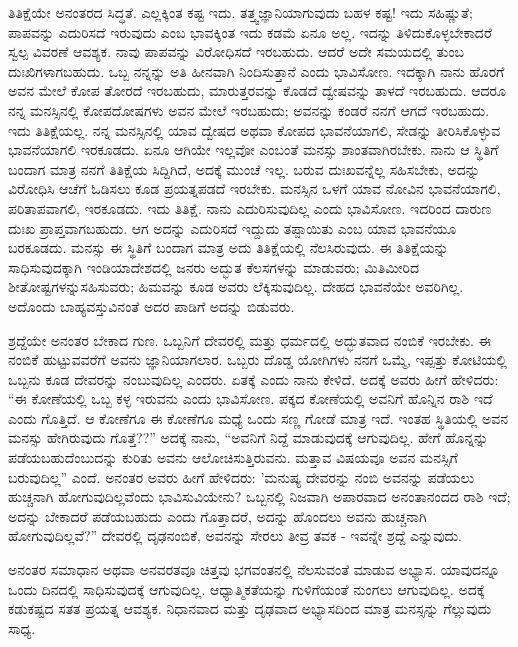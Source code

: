 ತಿತಿಕ್ಷೆಯೇ ಅನಂತರದ ಸಿದ್ಧತೆ. ಎಲ್ಲಕ್ಕಿಂತ ಕಷ್ಟ ಇದು. ತತ್ತ್ವಜ್ಞಾನಿಯಾಗುವುದು ಬಹಳ ಕಷ್ಟ! ಇದು ಸಹಿಷ್ಣುತೆ; ಪಾಪವನ್ನು ಎದುರಿಸದೆ ಇರುವುದು ಎಂಬ ಭಾವಕ್ಕಿಂತ ಇದು ಕಡಮೆ ಏನೂ ಅಲ್ಲ. ಇದನ್ನು ತಿಳಿದುಕೊಳ್ಳಬೇಕಾದರೆ ಸ್ವಲ್ಪ ವಿವರಣೆ ಆವಶ್ಯಕ. ನಾವು ಪಾಪವನ್ನು ವಿರೋಧಿಸದೆ ಇರಬಹುದು. ಆದರೆ ಅದೇ ಸಮಯದಲ್ಲಿ ತುಂಬ ದುಃಖಿಗಳಾಗಬಹುದು. ಒಬ್ಬ ನನ್ನನ್ನು ಅತಿ ಹೀನವಾಗಿ ನಿಂದಿಸುತ್ತಾನೆ ಎಂದು ಭಾವಿಸೋಣ. ಇದಕ್ಕಾಗಿ ನಾನು ಹೊರಗೆ ಅವನ ಮೇಲೆ ಕೋಪ ತೋರದೆ ಇರಬಹುದು, ಮಾರುತ್ತರವನ್ನು ಕೊಡದೆ ದ್ವೇಷವನ್ನು ತಾಳದೆ ಇರಬಹುದು. ಆದರೂ ನನ್ನ ಮನಸ್ಸಿನಲ್ಲಿ ಕೋಪದೋಷಗಳು ಅವನ ಮೇಲೆ ಇರಬಹುದು; ಅವನನ್ನು ಕಂಡರೆ ನನಗೆ ಆಗದೆ ಇರಬಹುದು. ಇದು ತಿತಿಕ್ಷೆಯಲ್ಲ. ನನ್ನ ಮನಸ್ಸಿನಲ್ಲಿ ಯಾವ ದ್ವೇಷದ ಅಥವಾ ಕೋಪದ ಭಾವನೆಯಾಗಲಿ, ಸೇಡನ್ನು ತೀರಿಸಿಕೊಳ್ಳುವ ಭಾವನೆಯಾಗಲಿ ಇರಕೂಡದು. ಏನೂ ಆಗಿಯೇ ಇಲ್ಲವೋ ಎಂಬಂತೆ ಮನಸ್ಸು ಶಾಂತವಾಗಿರಬೇಕು. ನಾನು ಆ ಸ್ಥಿತಿಗೆ ಬಂದಾಗ ಮಾತ್ರ ನನಗೆ ತಿತಿಕ್ಷೆಯ ಸಿದ್ದಿಗಿದೆ, ಅದಕ್ಕೆ ಮುಂಚೆ ಇಲ್ಲ. ಬರುವ ದುಃಖವನ್ನೆಲ್ಲ ಸಹಿಸಬೇಕು, ಅದನ್ನು ವಿರೋಧಿಸಿ ಆಚೆಗೆ ಓಡಿಸಲು ಕೂಡ ಪ್ರಯತ್ನಪಡದೆ ಇರಬೇಕು. ಮನಸ್ಸಿನ ಒಳಗೆ ಯಾವ ನೋವಿನ ಭಾವನೆಯಾಗಲಿ, ಪರಿತಾಪವಾಗಲಿ, ಇರಕೂಡದು. ಇದು ತಿತಿಕ್ಷೆ. ನಾನು ಎದುರಿಸುವುದಿಲ್ಲ ಎಂದು ಭಾವಿಸೋಣ. ಇದರಿಂದ ದಾರುಣ ದುಃಖ ಪ್ರಾಪ್ತವಾಗಬಹುದು. ಆಗ ಅದನ್ನು ಎದುರಿಸದೆ ಇದ್ದುದು ತಪ್ಪಾಯಿತು ಎಂಬ ಯಾವ ಭಾವನೆಯೂ ಬರಕೂಡದು. ಮನಸ್ಸು ಈ ಸ್ಥಿತಿಗೆ ಬಂದಾಗ ಮಾತ್ರ ಅದು ತಿತಿಕ್ಷೆಯಲ್ಲಿ ನೆಲಸಿರುವುದು. ಈ ತಿತಿಕ್ಷೆಯನ್ನು ಸಾಧಿಸುವುದಕ್ಕಾಗಿ ಇಂಡಿಯಾದೇಶದಲ್ಲಿ ಜನರು ಅದ್ಭುತ ಕೆಲಸಗಳನ್ನು ಮಾಡುವರು; ಮಿತಿಮೀರಿದ ಶೀತೋಷ್ಟಗಳನ್ನು\break ಸಹಿಸುವರು; ಹಿಮವನ್ನು ಕೂಡ ಅವರು ಲೆಕ್ಕಿಸುವುದಿಲ್ಲ. ದೇಹದ ಭಾವನೆಯೇ ಅವರಿಗಿಲ್ಲ. ಅದೊಂದು ಬಾಹ್ಯವಸ್ತುವಿನಂತೆ ಅದರ ಪಾಡಿಗೆ ಅದನ್ನು ಬಿಡುವರು.

ಶ್ರದ್ದೆಯೇ ಅನಂತರ ಬೇಕಾದ ಗುಣ. ಒಬ್ಬನಿಗೆ ದೇವರಲ್ಲಿ ಮತ್ತು ಧರ್ಮದಲ್ಲಿ ಅದ್ಭುತವಾದ ನಂಬಿಕೆ ಇರಬೇಕು. ಈ ನಂಬಿಕೆ ಹುಟ್ಟುವವರೆಗೆ ಅವನು ಜ್ಞಾನಿಯಾಗಲಾರ. ಒಬ್ಬರು ದೊಡ್ಡ ಯೋಗಿಗಳು ನನಗೆ ಒಮ್ಮೆ, ಇಪ್ಪತ್ತು ಕೋಟಿಯಲ್ಲಿ ಒಬ್ಬನು ಕೂಡ ದೇವರನ್ನು ನಂಬುವುದಿಲ್ಲ ಎಂದರು. ಏತಕ್ಕೆ ಎಂದು ನಾನು ಕೇಳಿದೆ. ಅದಕ್ಕೆ ಅವರು ಹೀಗೆ ಹೇಳಿದರು: “ಈ ಕೋಣೆಯಲ್ಲಿ ಒಬ್ಬ ಕಳ್ಳ ಇರುವನು ಎಂದು ಭಾವಿಸೋಣ. ಪಕ್ಕದ ಕೋಣೆಯಲ್ಲಿ ಅವನಿಗೆ ಹೊನ್ನಿನ ರಾಶಿ ಇದೆ ಎಂದು ಗೊತ್ತಿದೆ. ಆ ಕೋಣೆಗೂ ಈ ಕೋಣೆಗೂ ಮಧ್ಯೆ ಒಂದು ಸಣ್ಣ ಗೋಡೆ ಮಾತ್ರ ಇದೆ. ಇಂತಹ ಸ್ಥಿತಿಯಲ್ಲಿ ಅವನ ಮನಸ್ಸು ಹೇಗಿರುವುದು ಗೊತ್ತೆ??” ಅದಕ್ಕೆ ನಾನು, “ಅವನಿಗೆ ನಿದ್ದೆ ಮಾಡುವುದಕ್ಕೆ ಆಗುವುದಿಲ್ಲ. ಹೇಗೆ ಹೊನ್ನನ್ನು ಪಡೆಯಬಹುದೆಂಬುದನ್ನು ಕುರಿತು ಅವನು ಆಲೋಚಿಸುತ್ತಿರುವನು. ಮತ್ತಾವ ವಿಷಯವೂ ಅವನ ಮನಸ್ಸಿಗೆ ಬರುವುದಿಲ್ಲ'' ಎಂದೆ. ಅನಂತರ ಅವರು ಹೀಗೆ ಹೇಳಿದರು: 'ಮನುಷ್ಯ ದೇವರನ್ನು ನಂಬಿ ಅವನನ್ನು ಪಡೆಯಲು ಹುಚ್ಚನಾಗಿ ಹೋಗುವುದಿಲ್ಲವೆಂದು ಭಾವಿಸುವಿಯೇನು? ಒಬ್ಬನಲ್ಲಿ ನಿಜವಾಗಿ ಅಪಾರವಾದ ಅನಂತಾನಂದದ ರಾಶಿ ಇದೆ; ಅದನ್ನು ಬೇಕಾದರೆ ಪಡೆಯಬಹುದು ಎಂದು ಗೊತ್ತಾದರೆ, ಅದನ್ನು ಹೊಂದಲು ಅವನು ಹುಚ್ಚನಾಗಿ ಹೋಗುವುದಿಲ್ಲವೆ?'' ದೇವರಲ್ಲಿ ದೃಢನಂಬಿಕೆ, ಅವನನ್ನು ಸೇರಲು ತೀವ್ರ ತವಕ - ಇವನ್ನೇ ಶ್ರದ್ದೆ ಎನ್ನುವುದು.

ಅನಂತರ ಸಮಾಧಾನ ಅಥವಾ ಅನವರತವೂ ಚಿತ್ತವು ಭಗವಂತನಲ್ಲಿ ನೆಲಸುವಂತೆ ಮಾಡುವ ಅಭ್ಯಾಸ. ಯಾವುದನ್ನೂ ಒಂದು ದಿನದಲ್ಲಿ ಸಾಧಿಸುವುದಕ್ಕೆ ಆಗುವುದಿಲ್ಲ. ಆಧ್ಯಾತ್ಮಿಕತೆಯನ್ನು ಗುಳಿಗೆಯಂತೆ ನುಂಗಲು ಆಗುವುದಿಲ್ಲ. ಅದಕ್ಕೆ ಕಡುಕಷ್ಟದ ಸತತ ಪ್ರಯತ್ನ ಆವಶ್ಯಕ. ನಿಧಾನವಾದ ಮತ್ತು ದೃಢವಾದ ಅಭ್ಯಾಸದಿಂದ ಮಾತ್ರ ಮನಸ್ಸನ್ನು ಗೆಲ್ಲುವುದು ಸಾಧ್ಯ.

